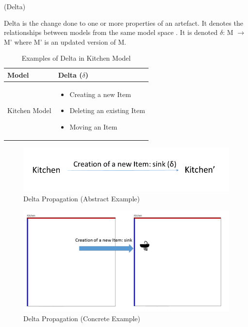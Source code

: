 \begin{defn}\label{defDelta} (Delta) \end{defn}
Delta is the change done to one or more properties of an artefact. It denotes the relationships between models from the same model space \cite{benchmarx-reload}. It is denoted $\delta$: M $\longrightarrow$ M' where M' is an updated version of M.

\begin{table}
	\centering	
	\begin{tabular}{|p{5cm}|p{10cm}|}
		\hline
		\rowcolor[gray]{.8}	
		\textbf{Model} & \textbf{Delta ($\delta$)} \\
		\hline
		Kitchen Model & 
		\begin{itemize}
			\item Creating a new Item
			\item Deleting an existing Item
			\item Moving an Item
		\end{itemize}\\
		\hline				
		
	\end{tabular}
	\label{tab:Examples_of_Delta}
	\caption{Examples of Delta in Kitchen Model}
\end{table}

\begin{figure}
	\includegraphics[width=1\textwidth]{figures/Delta_Abstract}
	\caption{Delta Propagation (Abstract Example)}
	\label{fig:DeltaPropagation_Abstract}
\end{figure}
\begin{figure}
	\includegraphics[width=1\textwidth]{figures/Delta_Concrete}
	\caption{Delta Propagation (Concrete Example)}
	\label{fig:DeltaPropagation_Concrete}
\end{figure}

